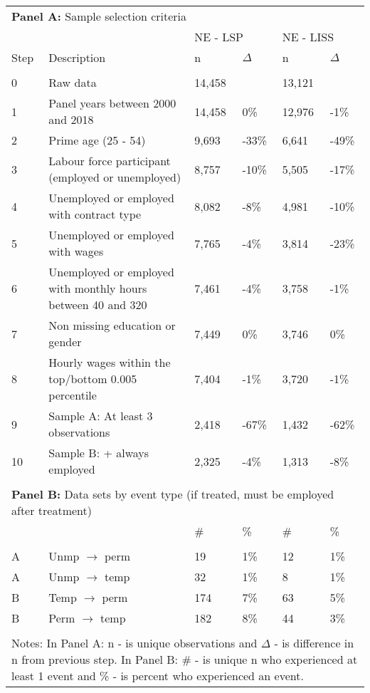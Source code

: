 \begin{tabular}{llllll}
   \toprule 
 [-1.8ex]
\multicolumn{6}{l}{{\bf Panel A:} Sample selection criteria} \\ 

&  & 
\multicolumn{2}{l}{NE - LSP} &
\multicolumn{2}{l}{NE - LISS}
\\  
 
 
\multicolumn{1}{l}{Step} & 
\multicolumn{1}{l}{Description} 
& n & $\Delta$
& n & $\Delta$
\\ 
\cmidrule(lr){1-2}
\cmidrule(lr){3-4}
\cmidrule(lr){5-6}
\\[-1.8ex]  
 
0 & Raw data & 14,458 &  & 13,121 &  \\ 
  1 & Panel years between 2000 and 2018 & 14,458 & 0\% & 12,976 & -1\% \\ 
  2 & Prime age (25 - 54) & 9,693 & -33\% & 6,641 & -49\% \\ 
  3 & Labour force participant (employed or unemployed) & 8,757 & -10\% & 5,505 & -17\% \\ 
  4 & Unemployed or employed with contract type & 8,082 & -8\% & 4,981 & -10\% \\ 
  5 & Unemployed or employed with wages & 7,765 & -4\% & 3,814 & -23\% \\ 
  6 & Unemployed or employed with monthly hours between 40 and 320 & 7,461 & -4\% & 3,758 & -1\% \\ 
  7 & Non missing education or gender & 7,449 & 0\% & 3,746 & 0\% \\ 
  8 & Hourly wages within the top/bottom 0.005 percentile & 7,404 & -1\% & 3,720 & -1\% \\ 
  9 & Sample A: At least 3 observations & 2,418 & -67\% & 1,432 & -62\% \\ 
  10 & Sample B: + always employed & 2,325 & -4\% & 1,313 & -8\% \\ 
   
\hline \\[-1.8ex]  
 
\multicolumn{6}{l}{{\bf Panel B:} Data sets by event type (if treated, must be employed after treatment)} \\ 

& 
& \# & \%
& \# & \%
\\ 
\cmidrule(lr){3-4}
\cmidrule(lr){5-6}
\\[-1.8ex]  
 
A & Unmp $\rightarrow$ perm & 19 & 1\% & 12 & 1\% \\ 
  A & Unmp $\rightarrow$ temp & 32 & 1\% & 8 & 1\% \\ 
  B & Temp $\rightarrow$ perm & 174 & 7\% & 63 & 5\% \\ 
  B & Perm $\rightarrow$ temp & 182 & 8\% & 44 & 3\% \\ 
   \bottomrule \\[-1.8ex] \multicolumn{6}{p{7in}}{Notes: In Panel A: n - is unique observations and $\Delta$ - is difference in n from previous step.  In Panel B: \# - is unique n who experienced at least 1 event and \% - is percent who experienced an event.} 
\end{tabular}

